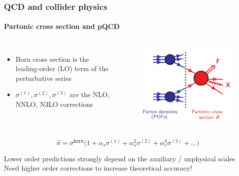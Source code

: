 \documentclass[aspectratio=43]{beamer}
\begin{document}
\begin{frame}
	
	\frametitle{QCD and collider physics}
	\framesubtitle{Partonic cross section and pQCD}
	
	\begin{columns}
	
	
	\begin{itemize}
		\item \footnotesize Born cross section is the leading-order (LO) term of the perturbative series
		\item \footnotesize $\sigma^{(1)}, \sigma^{(2)}, \sigma^{(3)}$ are the NLO, NNLO, N3LO corrections
	\end{itemize}
	
	\begin{figure}[!htb]
		\includegraphics[width = 5 cm]{plots/part1/chapter2/factorization_3.png}
	\end{figure}
	
	\end{columns}
	
	\begin{equation}
		\hat{\sigma} = \sigma^{\texttt{Born}} \Big( 1 +
		\alpha_{s} \sigma^{(1)} + 
		\alpha_{s}^{2} \sigma^{(2)} + 
		\alpha_{s}^{3} \sigma^{(3)} + ... \Big) \nonumber
	\end{equation}
	
	\footnotesize Lower order predictions strongly depend on the auxiliary / unphysical scales \\ {\color{red}Need higher order corrections to increase theoretical accuracy!}

\end{frame}
\end{document}
